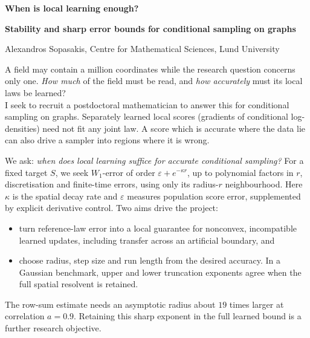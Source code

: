 \documentclass[12pt,a4paper]{article}
\newcommand{\W}{W_1}
\begin{document}
{\LARGE\bfseries When is local learning enough?\par}
\vspace{3pt}
{\large\bfseries Stability and sharp error bounds for conditional sampling on graphs\par}
\vspace{4pt}
Alexandros Sopasakis, Centre for Mathematical Sciences, Lund University

A field may contain a million coordinates while the research question concerns only one. \textit{How much} of the field must be read, and \textit{how accurately} must its local laws be learned? \\
I seek to recruit a postdoctoral mathematician to answer this for conditional sampling on graphs. Separately learned local scores (gradients of conditional log-densities) need not fit any joint law. A score which is accurate where the data lie can also drive a sampler into regions where it is wrong.

We ask: \emph{when does local learning suffice for accurate conditional sampling?} 
For a fixed target $S$, we seek $\W$-error of order $\varepsilon+e^{-\kappa r}$, up to polynomial factors in $r$, discretisation and finite-time errors, using only its radius-$r$ neighbourhood. Here  $\kappa$ is the spatial decay rate and $\varepsilon$ measures population score error, supplemented by explicit derivative control. 
Two aims drive the project: 
\begin{itemize}[nosep]
\setlength{\itemsep}{-10pt}
\setlength{\parskip}{0pt}
\setlength{\parsep}{0pt}
\setlength{\topsep}{0pt}
\setlength{\partopsep}{0pt}
\setlength{\leftmargin}{0em}
    \item[\textbf{(a)}] turn reference-law error into a local guarantee for nonconvex, incompatible learned updates, including transfer across an artificial boundary, and\\
\item[\textbf{(b)}]  choose radius, step size and run length from the desired accuracy. 
In a Gaussian benchmark, upper and lower truncation exponents agree when the full spatial resolvent is retained. 
\end{itemize}
The row-sum estimate needs an asymptotic radius about $19$ times larger at correlation $a=0.9$. Retaining this sharp exponent in the full learned bound is a further research objective.
\end{document}
